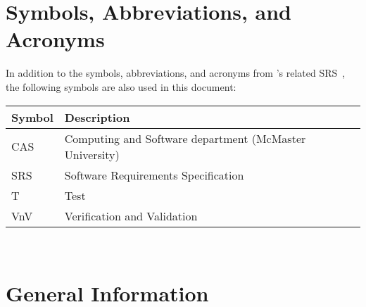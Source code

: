 \documentclass[12pt, titlepage]{article}
\begin{document}
\newpage

\tableofcontents

\newpage{}

\listoftables


\newpage

\section{Symbols, Abbreviations, and Acronyms}

In addition to the symbols, abbreviations, and acronyms from \progname{}'s
related SRS~\cite{BalaciBeamBendingSRS2023}, the following symbols are also used
in this document:\\

\renewcommand{\arraystretch}{1.2}
\begin{tabular}{l l}
    \toprule
    \textbf{Symbol} & \textbf{Description}                                    \\
    \midrule
    CAS             & Computing and Software department (McMaster University) \\
    SRS             & Software Requirements Specification                     \\
    T               & Test                                                    \\
    VnV             & Verification and Validation                             \\
    \bottomrule
\end{tabular}\\

\newpage



\section{General Information}
\end{document}
